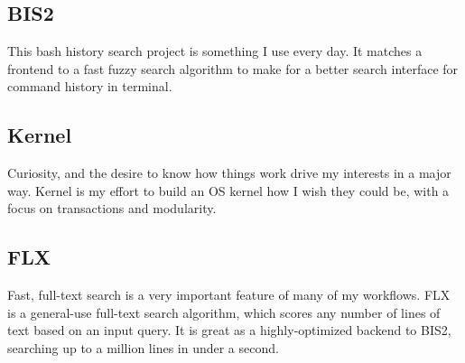 \documentclass[letterpaper]{article}
\begin{document}
\subsection*{BIS2}

This bash history search project is something I use every day. It matches a
frontend to a fast fuzzy search algorithm to make for a better search interface
for command history in terminal.

\subsection*{Kernel}

Curiosity, and the desire to know how things work drive my interests in a major
way. Kernel is my effort to build an OS kernel how I wish they could be, with a
focus on transactions and modularity.

\subsection*{FLX}

Fast, full-text search is a very important feature of many of my workflows. FLX
is a general-use full-text search algorithm, which scores any number of lines of
text based on an input query. It is great as a highly-optimized backend to BIS2,
searching up to a million lines in under a second.
\end{document}
